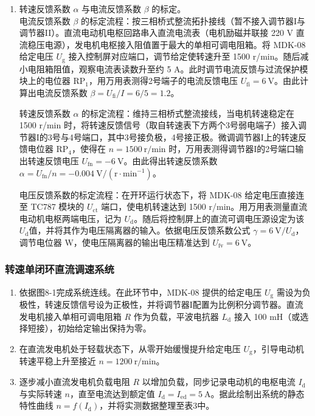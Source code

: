 \begin{framed}
{\begin{enumerate}
				\item 转速反馈系数 $\alpha$ 与电流反馈系数 $\beta$ 的标定。\\
				电流反馈系数 $\beta$ 的标定流程：按三相桥式整流拓扑接线（暂不接入调节器I与调节器II）。直流电动机电枢回路串入直流电流表（电机励磁并联接 220 V 直流稳压电源），发电机电枢接入阻值置于最大的单相可调电阻箱。将 MDK-08 给定电压 $U_{\text{g}}$ 接入控制屏对应端口，调节给定使转速升至 1500 r/min。随后减小电阻箱阻值，观察电流表读数升至约 5 A。此时调节电流反馈与过流保护模块上的电位器 $\text{RP}_1$，用万用表测得2号端子的电流反馈电压 $U_{\text{fi}}=6\ \text{V}$。由此计算出电流反馈系数 $\beta=U_{\text{fi}}/I=6/5=1.2$。
				
				转速反馈系数 $\alpha$ 的标定流程：维持三相桥式整流接线，当电机转速稳定在 1500 r/min 时，将转速反馈信号（取自转速表下方两个3号弱电端子）接入调节器I的3号与4号端口，其中3号接负极，4号接正极。微调调节器I上的转速反馈电位器 $\text{RP}_4$，使得在 $n=1500\ \text{r/min}$ 时，万用表测得调节器I的2号端口输出转速反馈电压 $U_{\text{fn}}=-6\ \text{V}$。由此得出转速反馈系数 $\alpha=U_{\text{fn}}/n=-0.004\ \text{V}/(\text{r}\cdot\text{min}^{-1})$。
				
				电压反馈系数的标定流程：在开环运行状态下，将 MDK-08 给定电压直接连至 TC787 模块的 $U_{\text{ct}}$ 端口，使电机转速达到 1500 r/min。用万用表测量直流电动机电枢两端电压，记为 $U_{\text{d}}$。随后将控制屏上的直流可调电压源设定为该 $U_{\text{d}}$值，并将其作为电压隔离器的输入。依据电压反馈系数公式 $\gamma=6\ \text{V}/U_{\text{d}}$，调节电位器 W，使电压隔离器的输出电压精准达到 $U_{\text{fv}}=6\ \text{V}$。
			\end{enumerate}
			
			\subsubsection{转速单闭环直流调速系统}
			\begin{enumerate}
				\item 依据图8-1完成系统连线。在此环节中，MDK-08 提供的给定电压 $U_{\text{g}}$ 需设为负极性，转速反馈信号设为正极性，并将调节器I配置为比例积分调节器。直流发电机接入单相可调电阻箱 $R$ 作为负载，平波电抗器 $L_\text{d}$ 接入 100 mH（或选择短接），初始给定输出保持为零。
				\item 在直流发电机处于轻载状态下，从零开始缓慢提升给定电压 $U_{\text{g}}$，引导电动机转速平稳上升至接近 $n=1200\ \text{r/min}$。
				\item 逐步减小直流发电机负载电阻 $R$ 以增加负载，同步记录电动机的电枢电流 $I_{\text{d}}$ 与实际转速 $n$，直至电流达到额定值 $I_{\text{d}}=I_{\text{ed}}=5\ \text{A}$。据此绘制出系统的静态特性曲线 $n=f(I_{\text{d}})$，并将实测数据整理至表3中。
			\end{enumerate}
			
}
\end{framed}
